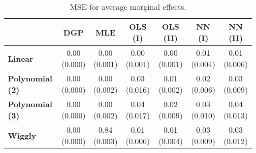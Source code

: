 \begin{table}[t]
\centering
\begin{threeparttable}
\caption{MSE for average marginal effects.}
\label{4_simulation_single_table_avgmrg_MSE}
\begin{tabular}{l|cccccc}\toprule
& \textbf{DGP} & \textbf{MLE} & \textbf{OLS (I)} & \textbf{OLS (II)} & \textbf{NN (I)} & \textbf{NN (II)}\\\midrule
\vspace{6pt}\textbf{Linear} & \cellbreak[t]{0.00\\\footnotesize(0.000)} & \cellbreak[t]{0.00\\\footnotesize(0.001)} & \cellbreak[t]{0.00\\\footnotesize(0.001)} & \cellbreak[t]{0.00\\\footnotesize(0.001)} & \cellbreak[t]{0.01\\\footnotesize(0.004)} & \cellbreak[t]{0.01\\\footnotesize(0.006)}\\
\vspace{6pt}\textbf{Polynomial (2)} & \cellbreak[t]{0.00\\\footnotesize(0.000)} & \cellbreak[t]{0.00\\\footnotesize(0.002)} & \cellbreak[t]{0.03\\\footnotesize(0.016)} & \cellbreak[t]{0.01\\\footnotesize(0.002)} & \cellbreak[t]{0.02\\\footnotesize(0.006)} & \cellbreak[t]{0.03\\\footnotesize(0.009)}\\
\vspace{6pt}\textbf{Polynomial (3)} & \cellbreak[t]{0.00\\\footnotesize(0.000)} & \cellbreak[t]{0.00\\\footnotesize(0.002)} & \cellbreak[t]{0.04\\\footnotesize(0.017)} & \cellbreak[t]{0.02\\\footnotesize(0.009)} & \cellbreak[t]{0.03\\\footnotesize(0.010)} & \cellbreak[t]{0.04\\\footnotesize(0.013)}\\
\vspace{6pt}\textbf{Wiggly} & \cellbreak[t]{0.00\\\footnotesize(0.000)} & \cellbreak[t]{0.84\\\footnotesize(0.003)} & \cellbreak[t]{0.01\\\footnotesize(0.006)} & \cellbreak[t]{0.01\\\footnotesize(0.004)} & \cellbreak[t]{0.03\\\footnotesize(0.009)} & \cellbreak[t]{0.03\\\footnotesize(0.012)}\\

\end{tabular}
\end{threeparttable}
\end{table}
